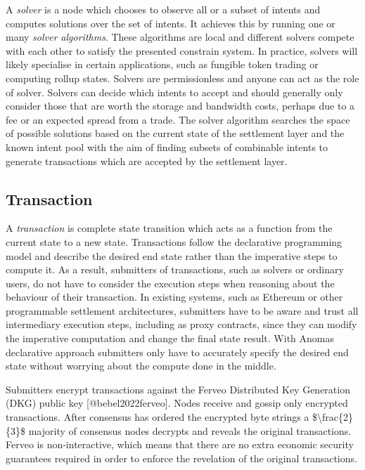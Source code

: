 A \emph{solver} is a node which chooses to observe all or a subset of
intents and computes solutions over the set of intents. It achieves this
by running one or many \emph{solver algorithms}. These algorithms are
local and different solvers compete with each other to satisfy the
presented constrain system. In practice, solvers will likely specialise
in certain applications, such as fungible token trading or computing
rollup states. Solvers are permissionless and anyone can act as the role
of solver. Solvers can decide which intents to accept and should
generally only consider those that are worth the storage and bandwidth
costs, perhaps due to a fee or an expected spread from a trade. The
solver algorithm searches the space of possible solutions based on the
current state of the settlement layer and the known intent pool with the
aim of finding subsets of combinable intents to generate transactions
which are accepted by the settlement layer.

\subsection{Transaction}\label{transaction}

A \emph{transaction} is complete state transition which acts as a
function from the current state to a new state. Transactions follow the
declarative programming model and describe the desired end state rather
than the imperative steps to compute it. As a result, submitters of
transactions, such as solvers or ordinary users, do not have to consider
the execution steps when reasoning about the behaviour of their
transaction. In existing systems, such as Ethereum or other programmable
settlement architectures, submitters have to be aware and trust all
intermediary execution steps, including as proxy contracts, since they
can modify the imperative computation and change the final state result.
With Anoma\textquotesingle s declarative approach submitters only have
to accurately specify the desired end state without worrying about the
compute done in the middle.

Submitters encrypt transactions against the Ferveo Distributed Key
Generation (DKG) public key {[}@bebel2022ferveo{]}. Nodes receive and
gossip only encrypted transactions. After consensus has ordered the
encrypted byte strings a \$\textbackslash frac\{2\}\{3\}\$ majority of
consensus nodes decrypts and reveals the original transactions. Ferveo
is non-interactive, which means that there are no extra economic
security guarantees required in order to enforce the revelation of the
original transactions.

